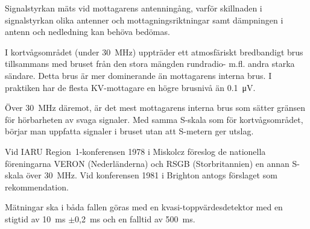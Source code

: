 \newpage

Signalstyrkan mäts vid mottagarens antenningång, varför skillnaden i
signalstyrkan olika antenner och mottagningsriktningar samt dämpningen
i antenn och nedledning kan behöva bedömas.

I kortvågsområdet (under \SI{30}{\mega\hertz}) uppträder ett atmosfäriskt
bredbandigt brus tillsammans med bruset från den stora mängden rundradio- m.fl.
andra starka sändare.
Detta brus är mer dominerande än mottagarens interna brus.
I praktiken har de flesta KV-mottagare en högre brusnivå än
\SI{0,1}{\micro\volt}.

Över \SI{30}{\mega\hertz} däremot, är det mest mottagarens interna brus som
sätter gränsen för hörbarheten av svaga signaler.
Med samma S-skala som för kortvågsområdet, börjar man uppfatta signaler i
bruset utan att S-metern ger utslag.

Vid IARU Region~1-konferensen 1978 i Miskolcz föreslog de nationella
föreningarna VERON (Nederländerna) och RSGB (Storbritannien) en annan
S-skala över \SI{30}{\mega\hertz}.
Vid konferensen 1981 i Brighton antogs förslaget som rekommendation.

Mätningar ska i båda fallen göras med en kvasi-toppvärdesdetektor med en stigtid
av \SI{10}{\milli\second} \(\pm\)0,2~ms och en falltid av \SI{500}{\milli\second}.
